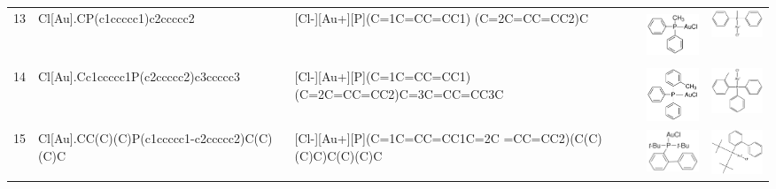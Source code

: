 \begin{landscape}
\begin{longtable}{m{0.3cm}m{6.7cm}m{7.7cm}m{2.3cm}m{2.3cm}}
 13 &
 Cl[Au].CP(c1ccccc1)c2ccccc2 & 
 [Cl-][Au+][P](C=1C=CC=CC1) (C=2C=CC=CC2)C & 
 \includegraphics[width=2.1cm, height=1.5cm]{imagenes/sigmaAldrich/Chloro(methyldiphenylphosphine)gold(I).jpeg} & 
 \includegraphics[width=2.2cm]{imagenes/sciFinder/pdf/Chloro(methyldiphenylphosphine)gold(I).pdf} \\




 14 &
 Cl[Au].Cc1ccccc1P(c2ccccc2)c3ccccc3 & 
 [Cl-][Au+][P](C=1C=CC=CC1) (C=2C=CC=CC2)C=3C=CC=CC3C & 
 \includegraphics[width=2.2cm]{imagenes/sigmaAldrich/Chloro[diphenyl(o-tolyl)phosphine]gold(I).jpeg} & 
 \includegraphics[width=2.2cm]{imagenes/sciFinder/pdf/Chloro[diphenyl(o-tolyl)phosphine]gold(I).pdf} \\


 15 &
 Cl[Au].CC(C)(C)P(c1ccccc1-c2ccccc2)C(C)(C)C & 
 [Cl-][Au+][P](C=1C=CC=CC1C=2C =CC=CC2)(C(C)(C)C)C(C)(C)C & 
 \includegraphics[width=2.2cm]{imagenes/sigmaAldrich/Chloro[(1,1-biphenyl-2-yl)di-tert-butylphosphine]gold(I).png} & 
 \includegraphics[width=2.2cm]{imagenes/sciFinder/pdf/Chloro[(1,1-biphenyl-2-yl)di-tert-butylphosphine]gold(I).pdf} \\




\end{longtable}
\end{landscape}
